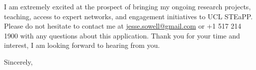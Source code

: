 \documentclass[11pt]{letter}
\begin{document}
\begin{letter}
%
I am extremely excited at the prospect of bringing my ongoing research projects, teaching, access to expert networks, and engagement initiatives to UCL STEaPP.
%
Please do not hesitate to contact me at \href{mailto:jesse.sowell@gmail.com}{jesse.sowell@gmail.com} or +1 517 214 1900 with any questions about this application.
%
Thank you for your time and interest, I am looking forward to hearing from you.

\vspace{\baselineskip}



\closing{Sincerely,}




\end{letter}
\end{document}
